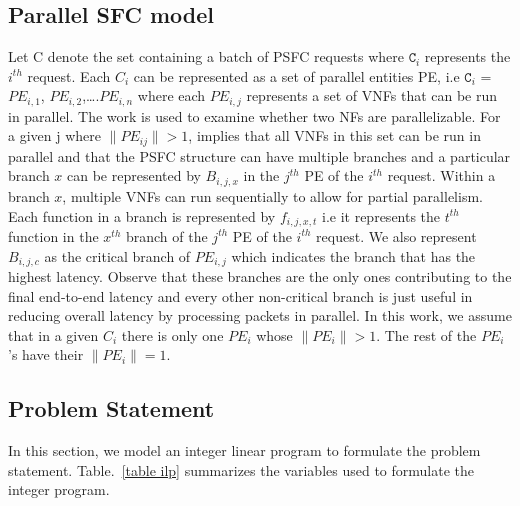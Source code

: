 \documentclass[journal]{IEEEtran}
\begin{document}
\subsection{Parallel SFC model}
Let C denote the set containing a batch of PSFC requests where $\texttt{C}_i$ represents the $i^{th}$ request. Each $C_i$ can be represented as a set of parallel entities PE, i.e $\texttt{C}_i$ = {$PE_{i,1}$, $PE_{i,2}$,….$PE_{i,n}$} where each $PE_{i,j}$ represents a set of VNFs that can be run in parallel. The work \cite{NFP} is used to examine whether two NFs are parallelizable. For a given j where $\lVert PE_{ij} \rVert > 1$, implies that all VNFs in this set can be run in parallel and that the PSFC structure can have multiple branches and a particular branch $x$ can be represented by $B_{i,j,x}$ in the $j^{th}$ PE of the $i^{th}$ request. Within a branch $x$, multiple VNFs can run sequentially to allow for partial parallelism. Each function in a branch is represented by $f_{i,j,x,t}$ i.e it represents the $t^{th}$ function in the $x^{th}$ branch of the $j^{th}$ PE of the $i^{th}$ request. We also represent $B_{i,j,c}$ as the critical branch of $PE_{i,j}$ which indicates the branch that has the highest latency. Observe that these branches are the only ones contributing to the final end-to-end latency and every other non-critical branch is just useful in reducing overall latency by processing packets in parallel.
In this work, we assume that in a given $C_i$ there is only one $PE_i$ whose $\lVert PE_i \rVert > 1$. The rest of the $PE_i$'s have their $\lVert PE_i \rVert = 1$.
\subsection{Problem Statement}
In this section, we model an integer linear program to formulate the problem statement. Table.~\ref{table ilp} summarizes the variables used to formulate the integer program. \\
\end{document}
